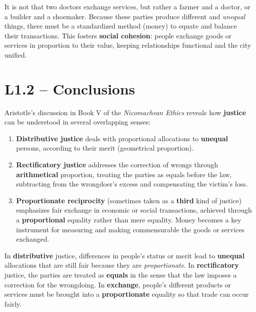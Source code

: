                     It is not that two doctors exchange services, but rather a farmer and a doctor, or a builder and a shoemaker. Because these parties produce different and \textit{unequal} things, there must be a standardized method (money) to equate and balance their transactions. This fosters \textbf{social cohesion}: people exchange goods or services in proportion to their value, keeping relationships functional and the city unified.

        \section*{L1.2 -- Conclusions}

            Aristotle's discussion in Book V of the \textit{Nicomachean Ethics} reveals how \textbf{justice} can be understood in several overlapping senses:
            \begin{enumerate}
              \item \textbf{Distributive justice} deals with proportional allocations to \textbf{unequal} persons, according to their merit (geometrical proportion).
              \item \textbf{Rectificatory justice} addresses the correction of wrongs through \textbf{arithmetical} proportion, treating the parties as equals before the law, subtracting from the wrongdoer's excess and compensating the victim's loss.
              \item \textbf{Proportionate reciprocity} (sometimes taken as a \textbf{third} kind of justice) emphasizes fair exchange in economic or social transactions, achieved through a \textbf{proportional} equality rather than mere equality. Money becomes a key instrument for measuring and making commensurable the goods or services exchanged.
            \end{enumerate}
            
            \begin{remark}
                In \textbf{distributive} justice, differences in people's status or merit lead to \textbf{unequal} allocations that are still fair because they are \textit{proportionate}. In \textbf{rectificatory} justice, the parties are treated as \textbf{equals} in the sense that the law imposes a correction for the wrongdoing. In \textbf{exchange}, people's different products or services must be brought into a \textbf{proportionate} equality so that trade can occur fairly.
            \end{remark}

